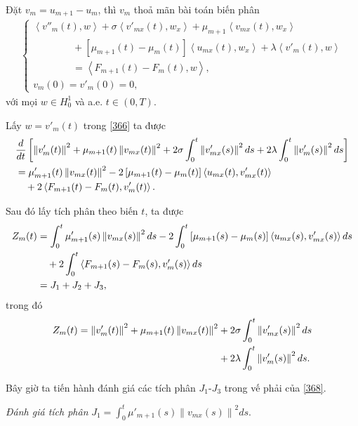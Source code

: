\documentclass[12pt,a4paper]{article}
\theoremstyle{definition}
\theoremstyle{definition}
\begin{document}
Đặt $v_m = u_{m+1} - u_m$, thì $v_m$ thoả mãn bài toán biến phân
\begin{align} \label{366}
\begin{cases}
    \left<v''_m(t), w\right> + \sigma \left<v'_{mx}(t), w_x\right> + \mu_{m+1}\left<v_{mx}(t), w_x\right> \\
    \quad\quad\quad\quad + \left[\mu_{m+1}(t) - \mu_m(t)\right]\left<u_{mx}(t), w_x\right> + \lambda \left<v'_m(t), w\right> \\
    \quad\quad\quad\quad = \left<F_{m+1}(t) - F_m(t), w\right>, \\
    v_m(0) = v'_m(0) = 0,
\end{cases}
\end{align}
với mọi $w \in H^1_0$ và a.e. $t \in (0,T)$.

Lấy $w = v'_m(t)$ trong \eqref{366} ta được
\begin{align}
    &\frac{d}{dt}\left[ \left\|v'_m(t)\right\|^2 + \mu_{m+1}(t) \left\|v_{mx}(t)\right\|^2 + 2 \sigma \int_0^t \left\|v'_{mx}(s)\right\|^2 ds + 2\lambda \int_0^t \left\|v'_m(s)\right\|^2 ds \right] \\
    &= \mu'_{m+1}(t)\left\|v_{mx}(t)\right\|^2 - 2 \left[\mu_{m+1}(t) - \mu_m(t)\right] \left<u_{mx}(t), v'_{mx}(t)\right> \notag \\
    &\quad+ 2 \left<F_{m+1}(t) - F_m(t), v'_m(t)\right>. \notag
\end{align}

Sau đó lấy tích phân theo biến $t$, ta được
\begin{align} \label{368}
    Z_m(t) &= \int_0^t \mu'_{m+1}(s)\left\|v_{mx}(s)\right\|^2 ds - 2 \int_0^t \left[\mu_{m+1}(s) - \mu_m(s)\right] \left<u_{mx}(s), v'_{mx}(s)\right> ds \\
    &\quad + 2 \int_0^t \left<F_{m+1}(s) - F_m(s), v'_m(s)\right> ds \notag \\
    &= J_1 + J_2 + J_3, \notag
\end{align}
trong đó
\begin{align}
    Z_m(t) = \left\|v'_m(t)\right\|^2 + \mu_{m+1}(t) \left\|v_{mx}(t)\right\|^2 &+ 2 \sigma \int_0^t \left\|v'_{mx}(s)\right\|^2 ds \\
    &+ 2\lambda \int_0^t \left\|v'_m(s)\right\|^2 ds. \notag
\end{align}

Bây giờ ta tiến hành đánh giá các tích phân $J_1$-$J_3$ trong vế phải của \eqref{368}.

\textit{Đánh giá tích phân} $\displaystyle J_1 = \int_0^t \mu'_{m+1}(s)\left\|v_{mx}(s)\right\|^2 ds$.
\end{document}
